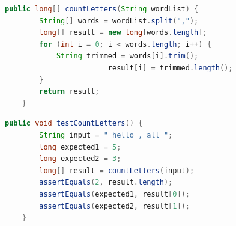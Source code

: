 \begin{lstlisting}[float,caption={A method to count letters in a word list.},stepnumber=2,numberfirstline=false,label=lst:countLetters,language=Java]
    public long[] countLetters(String wordList) {
        String[] words = wordList.split(",");
        long[] result = new long[words.length];
        for (int i = 0; i < words.length; i++) {
            String trimmed = words[i].trim();
						result[i] = trimmed.length();
        }
        return result;
    }
\end{lstlisting}

\begin{lstlisting}[float,caption={A test for countLetters.},stepnumber=2,numberfirstline=false,label=lst:testCountLetters,language=Java]
    public void testCountLetters() {
        String input = " hello , all ";
        long expected1 = 5;
        long expected2 = 3;
        long[] result = countLetters(input);
        assertEquals(2, result.length);
        assertEquals(expected1, result[0]);
        assertEquals(expected2, result[1]);
    }
\end{lstlisting}


